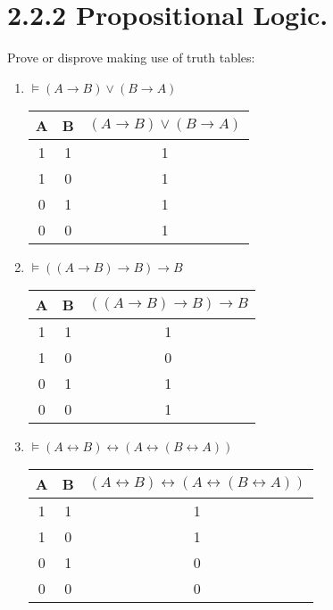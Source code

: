 \documentclass{article}
\begin{document}
\section*{2.2.2 Propositional Logic.}
Prove or disprove making use of truth tables:
\begin{enumerate}
    \item $\models (A \rightarrow B) \vee (B \rightarrow A)$
    \begin{table}[h!]
        \centering
        \begin{tabular}{|c|c|c|}
            \hline
            \textbf{A} & \textbf{B} & \textbf{$(A \rightarrow B) \vee (B \rightarrow A)$}\\
            \hline
            1 & 1 & 1 \\
            \hline
            1 & 0 & 1 \\
            \hline
            0 & 1 & 1 \\
            \hline
            0 & 0 & 1 \\
            \hline
        \end{tabular}
    \end{table}

    \item $\models ((A \rightarrow B) \rightarrow B) \rightarrow B$
    \begin{table}[h!]
        \centering
        \begin{tabular}{|c|c|c|}
            \hline
            \textbf{A} & \textbf{B} & \textbf{$((A \rightarrow B) \rightarrow B) \rightarrow B$}\\
            \hline
            1 & 1 & 1 \\
            \hline
            1 & 0 & 0 \\
            \hline
            0 & 1 & 1 \\
            \hline
            0 & 0 & 1 \\
            \hline
        \end{tabular}
    \end{table}
    \item $\models (A \leftrightarrow B) \leftrightarrow (A \leftrightarrow (B \leftrightarrow A))$
    \begin{table}[h!]
        \centering
        \begin{tabular}{|c|c|c|}
            \hline
            \textbf{A} & \textbf{B} & \textbf{$ (A \leftrightarrow B) \leftrightarrow (A \leftrightarrow (B \leftrightarrow A))$}\\
            \hline
            1 & 1 & 1 \\
            \hline
            1 & 0 & 1 \\
            \hline
            0 & 1 & 0 \\
            \hline
            0 & 0 & 0 \\
            \hline
        \end{tabular}
    \end{table}
    \newpage


\end{enumerate}
\end{document}

